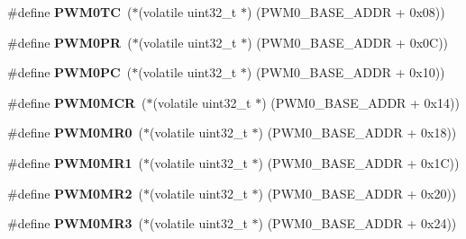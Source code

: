 \begin{DoxyCompactItemize}
\mbox{\label{group__lpc24xx__regs_ga25bd2915982ec7b01799d05d0ef54572}} 
\#define {\bfseries P\+W\+M0\+TC}~($\ast$(volatile uint32\+\_\+t $\ast$) (P\+W\+M0\+\_\+\+B\+A\+S\+E\+\_\+\+A\+D\+DR + 0x08))
\item 
\mbox{\label{group__lpc24xx__regs_gaa17b3467999643b9d8def3ecb375cb78}} 
\#define {\bfseries P\+W\+M0\+PR}~($\ast$(volatile uint32\+\_\+t $\ast$) (P\+W\+M0\+\_\+\+B\+A\+S\+E\+\_\+\+A\+D\+DR + 0x0\+C))
\item 
\mbox{\label{group__lpc24xx__regs_gac706e173dca8a1b4a611ee043a2a8fa2}} 
\#define {\bfseries P\+W\+M0\+PC}~($\ast$(volatile uint32\+\_\+t $\ast$) (P\+W\+M0\+\_\+\+B\+A\+S\+E\+\_\+\+A\+D\+DR + 0x10))
\item 
\mbox{\label{group__lpc24xx__regs_gafad545f2443694b49657b4c6d12cd0fa}} 
\#define {\bfseries P\+W\+M0\+M\+CR}~($\ast$(volatile uint32\+\_\+t $\ast$) (P\+W\+M0\+\_\+\+B\+A\+S\+E\+\_\+\+A\+D\+DR + 0x14))
\item 
\mbox{\label{group__lpc24xx__regs_ga49fa4cd7e435f042b977339102a6d6e9}} 
\#define {\bfseries P\+W\+M0\+M\+R0}~($\ast$(volatile uint32\+\_\+t $\ast$) (P\+W\+M0\+\_\+\+B\+A\+S\+E\+\_\+\+A\+D\+DR + 0x18))
\item 
\mbox{\label{group__lpc24xx__regs_ga384f0d5fabd92e21c742f1a71891729a}} 
\#define {\bfseries P\+W\+M0\+M\+R1}~($\ast$(volatile uint32\+\_\+t $\ast$) (P\+W\+M0\+\_\+\+B\+A\+S\+E\+\_\+\+A\+D\+DR + 0x1\+C))
\item 
\mbox{\label{group__lpc24xx__regs_ga4b22d6f480ffba217402af5a236e3d78}} 
\#define {\bfseries P\+W\+M0\+M\+R2}~($\ast$(volatile uint32\+\_\+t $\ast$) (P\+W\+M0\+\_\+\+B\+A\+S\+E\+\_\+\+A\+D\+DR + 0x20))
\item 
\mbox{\label{group__lpc24xx__regs_ga12a1e0d552900aa9e7d250c4c212bde3}} 
\#define {\bfseries P\+W\+M0\+M\+R3}~($\ast$(volatile uint32\+\_\+t $\ast$) (P\+W\+M0\+\_\+\+B\+A\+S\+E\+\_\+\+A\+D\+DR + 0x24))
\item 
\mbox{\label{group__lpc24xx__regs_ga9b0bbb492f048b4e862c4cf9dab6326c}} 

\end{DoxyCompactItemize}
